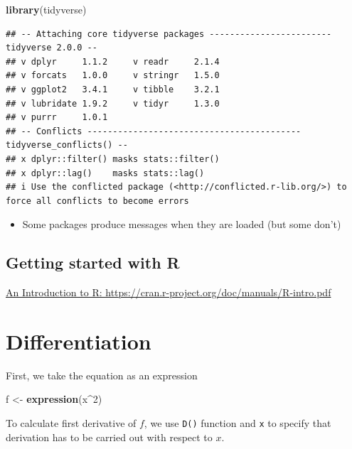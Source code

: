 \documentclass[
]{book}
\newenvironment{Shaded}{\begin{snugshade}}{\end{snugshade}}
\newcommand{\DecValTok}[1]{\textcolor[rgb]{0.00,0.00,0.81}{#1}}
\newcommand{\FunctionTok}[1]{\textcolor[rgb]{0.13,0.29,0.53}{\textbf{#1}}}
\newcommand{\NormalTok}[1]{#1}
\newcommand{\OtherTok}[1]{\textcolor[rgb]{0.56,0.35,0.01}{#1}}
\newcommand{\SpecialCharTok}[1]{\textcolor[rgb]{0.81,0.36,0.00}{\textbf{#1}}}
\providecommand{\tightlist}{%
  \setlength{\itemsep}{0pt}\setlength{\parskip}{0pt}}
\begin{document}
\begin{Shaded}
\begin{Highlighting}[]
\FunctionTok{library}\NormalTok{(tidyverse)}
\end{Highlighting}
\end{Shaded}

\begin{verbatim}
## -- Attaching core tidyverse packages ------------------------ tidyverse 2.0.0 --
## v dplyr     1.1.2     v readr     2.1.4
## v forcats   1.0.0     v stringr   1.5.0
## v ggplot2   3.4.1     v tibble    3.2.1
## v lubridate 1.9.2     v tidyr     1.3.0
## v purrr     1.0.1     
## -- Conflicts ------------------------------------------ tidyverse_conflicts() --
## x dplyr::filter() masks stats::filter()
## x dplyr::lag()    masks stats::lag()
## i Use the conflicted package (<http://conflicted.r-lib.org/>) to force all conflicts to become errors
\end{verbatim}

\begin{itemize}
\tightlist
\item
  Some packages produce messages when they are loaded (but some don't)
\end{itemize}

\hypertarget{getting-started-with-r}{%
\section{Getting started with R}\label{getting-started-with-r}}

\href{https://cran.r-project.org/doc/manuals/R-intro.pdf}{An Introduction to R: https://cran.r-project.org/doc/manuals/R-intro.pdf}

\hypertarget{differentiation}{%
\chapter{Differentiation}\label{differentiation}}

First, we take the equation as an expression

\begin{Shaded}
\begin{Highlighting}[]
\NormalTok{f }\OtherTok{\textless{}{-}} \FunctionTok{expression}\NormalTok{(x}\SpecialCharTok{\^{}}\DecValTok{2}\NormalTok{)}
\end{Highlighting}
\end{Shaded}

To calculate first derivative of \(f\), we use \texttt{D()} function and \texttt{x} to specify that derivation has to be carried out with respect to
\(x\).
\end{document}
